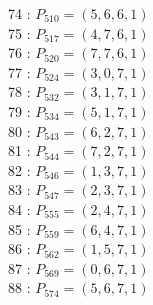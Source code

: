 \documentclass{article}
\begin{document}
{\begin{multicols}{3}
74 : $P_{510}=( 5, 6, 6, 1 )$\\
75 : $P_{517}=( 4, 7, 6, 1 )$\\
76 : $P_{520}=( 7, 7, 6, 1 )$\\
77 : $P_{524}=( 3, 0, 7, 1 )$\\
78 : $P_{532}=( 3, 1, 7, 1 )$\\
79 : $P_{534}=( 5, 1, 7, 1 )$\\
80 : $P_{543}=( 6, 2, 7, 1 )$\\
81 : $P_{544}=( 7, 2, 7, 1 )$\\
82 : $P_{546}=( 1, 3, 7, 1 )$\\
83 : $P_{547}=( 2, 3, 7, 1 )$\\
84 : $P_{555}=( 2, 4, 7, 1 )$\\
85 : $P_{559}=( 6, 4, 7, 1 )$\\
86 : $P_{562}=( 1, 5, 7, 1 )$\\
87 : $P_{569}=( 0, 6, 7, 1 )$\\
88 : $P_{574}=( 5, 6, 7, 1 )$\\
\end{multicols}


%


%


}%
\end{document}
